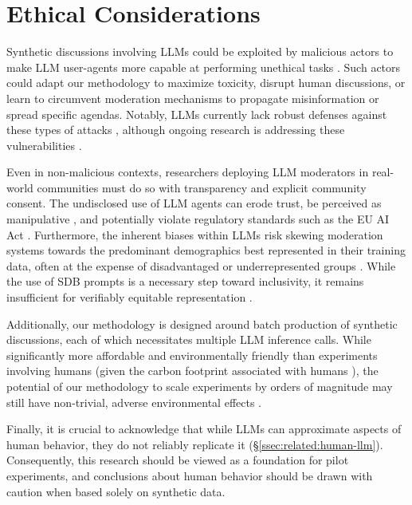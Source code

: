 %
\section{Ethical Considerations}
\label{sec:ethical}

Synthetic discussions involving \acp{LLM} could be exploited by malicious actors to make \ac{LLM} user-agents more capable at performing unethical tasks \cite{majumdar_2024_nefarious, MARULLI20245340}. Such actors could adapt our methodology to  maximize toxicity, disrupt human discussions, or learn to circumvent moderation mechanisms to propagate misinformation or spread specific agendas. Notably, \acp{LLM} currently lack robust defenses against these types of attacks \cite{li_2025_vulnerable}, although ongoing research is addressing these vulnerabilities \cite{wang_2025_risk}.

Even in non-malicious contexts, researchers deploying \ac{LLM} moderators in real-world communities must do so with transparency and explicit community consent. The undisclosed use of \ac{LLM} agents can erode trust, be perceived as manipulative \cite{retraction_watch}, and potentially violate regulatory standards such as the EU AI Act \cite{eu_ai_act_2024}. Furthermore, the inherent biases within \acp{LLM} risk skewing moderation systems towards the predominant demographics best represented in their training data, often at the expense of disadvantaged or underrepresented groups \cite{rossi_2024, anthis_2025, burton2024large}. While the use of \ac{SDB} prompts is a necessary step toward inclusivity, it remains insufficient for verifiably equitable representation \cite{rossi_2024}.

Additionally, our methodology is designed around batch production of synthetic discussions, each of which necessitates multiple \ac{LLM} inference calls. While significantly more affordable and environmentally friendly than experiments involving humans (given the carbon footprint associated with humans \cite{Ren2024}), the potential of our methodology to scale experiments by orders of magnitude may still have non-trivial, adverse environmental effects \cite{ding_2024_sustainable}. 

Finally, it is crucial to acknowledge that while \acp{LLM} can approximate aspects of human behavior, they do not reliably replicate it (\S\ref{ssec:related:human-llm}). Consequently, this research should be viewed as a foundation for pilot experiments, and conclusions about human behavior should be drawn with caution when based solely on synthetic data.